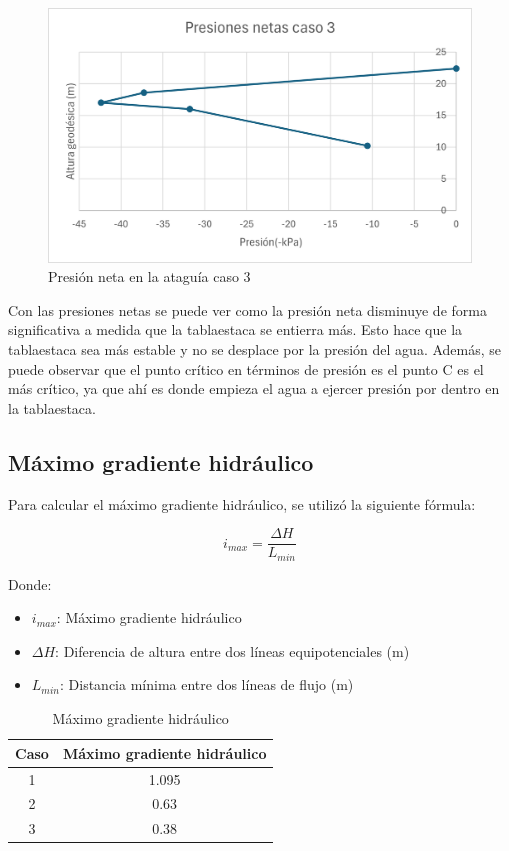 \documentclass{article}
\begin{document}
\begin{figure}[h!]
  \centering
  \includegraphics[width=0.55\linewidth]{graficos/grafico_presiones_3.png}
  \caption{Presión neta en la ataguía caso 3}
  \label{fig:presion_neta3}
\end{figure}


Con las presiones netas se puede ver como la presión neta disminuye de forma significativa a medida que la tablaestaca se entierra más. Esto hace que la tablaestaca sea más estable y no se desplace por la presión del agua. Además, se puede observar que el punto crítico en términos de presión es el punto C es el más crítico, ya que ahí es donde empieza el agua a ejercer presión por dentro en la tablaestaca.


\subsection{Máximo gradiente hidráulico}

Para calcular el máximo gradiente hidráulico, se utilizó la siguiente fórmula:

\begin{equation}
  i_{max} = \frac{\Delta H}{L_{min}}
\end{equation}

Donde:
\begin{itemize}
    \item $i_{max}$: Máximo gradiente hidráulico 
    \item $\Delta H$: Diferencia de altura entre dos líneas equipotenciales (m)
    \item $L_{min}$: Distancia mínima entre dos líneas de flujo (m)
\end{itemize}


\begin{table}[h!]
  \centering
  \begin{tabular}{cc}
    \hline
    \textbf{Caso} & \textbf{Máximo gradiente hidráulico} \\
    \hline
    1 & 1.095 \\
    2 & 0.63 \\
    3 & 0.38 \\
    \hline
  \end{tabular}
  \caption{Máximo gradiente hidráulico}
  \label{tab:gradiente}
\end{table}
\end{document}
